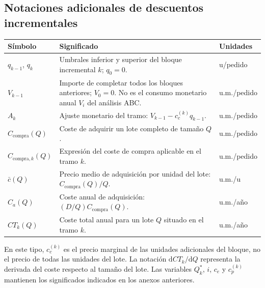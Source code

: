\documentclass[11pt,a4paper]{article}
\begin{document}
\subsection{Notaciones adicionales de descuentos incrementales}
\begin{longtable}{@{}p{2.8cm}p{7.2cm}p{3.5cm}@{}}
    \toprule
    Símbolo                  & Significado                                                                                                          & Unidades    \\
    \midrule
    \endhead
    $q_{k-1}$, $q_k$         & Umbrales inferior y superior del bloque incremental $k$; $q_0=0$.                                                    & u/pedido    \\
    $V_{k-1}$                & Importe de completar todos los bloques anteriores; $V_0=0$. No es el consumo monetario anual $V_i$ del análisis ABC. & u.m./pedido \\
    $A_k$                    & Ajuste monetario del tramo: $V_{k-1}-c_c^{(k)}q_{k-1}$.                                                              & u.m./pedido \\
    $C_{\text{compra}}(Q)$   & Coste de adquirir un lote completo de tamaño $Q$.                                                                    & u.m./pedido \\
    $C_{\text{compra},k}(Q)$ & Expresión del coste de compra aplicable en el tramo $k$.                                                             & u.m./pedido \\
    $\bar{c}(Q)$             & Precio medio de adquisición por unidad del lote: $C_{\text{compra}}(Q)/Q$.                                           & u.m./u      \\
    $C_a(Q)$                 & Coste anual de adquisición: $(D/Q)C_{\text{compra}}(Q)$.                                                             & u.m./año    \\
    $CT_k(Q)$                & Coste total anual para un lote $Q$ situado en el tramo $k$.                                                          & u.m./año    \\
    \bottomrule
\end{longtable}
En este tipo, $c_c^{(k)}$ es el precio marginal de las unidades adicionales del bloque, no el precio de todas las unidades del lote. La notación $\mathrm{d}CT_k/\mathrm{d}Q$ representa la derivada del coste respecto al tamaño del lote. Las variables $Q_k^{*}$, $i$, $c_e$ y $c_p^{(k)}$ mantienen los significados indicados en los anexos anteriores.
\end{document}
